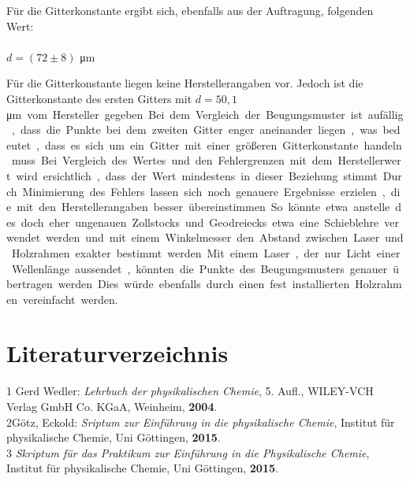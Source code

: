 \documentclass[12pt,a4paper,titlepage,headinclude,bibtotoc]{scrartcl}
\begin{document}
Für die Gitterkonstante ergibt sich, ebenfalls aus der Auftragung, folgenden Wert:\\\\
\centering
$ d = (72 \pm 8)$ \si\micro m\\

\begin{flushleft}
Für die Gitterkonstante liegen keine Herstellerangaben vor. Jedoch ist die Gitterkonstante des ersten Gitters mit $d = 50,1$ \si\micro m vom Hersteller gegeben. Bei dem Vergleich der Beugungsmuster ist aufällig, dass die Punkte bei dem zweiten Gitter enger aneinander liegen, was bedeutet, dass es sich um ein Gitter mit einer größeren Gitterkonstante handeln muss. Bei Vergleich des Wertes und den Fehlergrenzen mit dem Herstellerwert wird ersichtlich, dass der Wert mindestens in dieser Beziehung stimmt.
Durch Minimierung des Fehlers lassen sich noch genauere Ergebnisse erzielen, die mit den Herstellerangaben besser übereinstimmen. So könnte etwa anstelle des doch eher ungenauen Zollstocks und Geodreiecks etwa eine Schieblehre verwendet werden und mit einem Winkelmesser den Abstand zwischen Laser und Holzrahmen exakter bestimmt werden. Mit einem Laser, der nur Licht einer Wellenlänge aussendet, könnten die Punkte des Beugungsmusters genauer übertragen werden. Dies würde ebenfalls durch einen fest installierten Holzrahmen vereinfacht werden.
\end{flushleft}

\section{Literaturverzeichnis}
\begin{flushleft}
1 \quad Gerd Wedler: \emph{Lehrbuch der physikalischen Chemie}, 5. Aufl., WILEY-VCH Verlag GmbH Co. KGaA, Weinheim, \textbf{2004}.\\
\vspace{0,5 cm}
2\quad Götz, Eckold: \emph{Sriptum zur Einführung in die physikalische Chemie}, Institut für physikalische Chemie, Uni Göttingen, \textbf{2015}.\\
\vspace{0,5 cm}
3 \quad \emph{Skriptum für das Praktikum zur Einführung in die Physikalische Chemie}, Institut für physikalische Chemie, Uni Göttingen, \textbf{2015}.\\
\end{flushleft}
\end{document}
